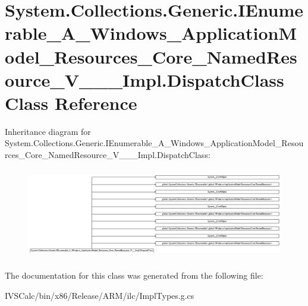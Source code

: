 \hypertarget{class_system_1_1_collections_1_1_generic_1_1_i_enumerable___a___windows___application_model___re4c37e09eb8f7a56d7ca78baa5c0aefc0}{}\section{System.\+Collections.\+Generic.\+I\+Enumerable\+\_\+\+A\+\_\+\+Windows\+\_\+\+Application\+Model\+\_\+\+Resources\+\_\+\+Core\+\_\+\+Named\+Resource\+\_\+\+V\+\_\+\+\_\+\+\_\+\+Impl.\+Dispatch\+Class Class Reference}
\label{class_system_1_1_collections_1_1_generic_1_1_i_enumerable___a___windows___application_model___re4c37e09eb8f7a56d7ca78baa5c0aefc0}
Inheritance diagram for System.\+Collections.\+Generic.\+I\+Enumerable\+\_\+\+A\+\_\+\+Windows\+\_\+\+Application\+Model\+\_\+\+Resources\+\_\+\+Core\+\_\+\+Named\+Resource\+\_\+\+V\+\_\+\+\_\+\+\_\+\+Impl.\+Dispatch\+Class\+:\begin{figure}[H]
\begin{center}
\leavevmode
\includegraphics[height=3.989638cm]{class_system_1_1_collections_1_1_generic_1_1_i_enumerable___a___windows___application_model___re4c37e09eb8f7a56d7ca78baa5c0aefc0}
\end{center}
\end{figure}


The documentation for this class was generated from the following file\+:\begin{DoxyCompactItemize}
\item 
I\+V\+S\+Calc/bin/x86/\+Release/\+A\+R\+M/ilc/Impl\+Types.\+g.\+cs\end{DoxyCompactItemize}
